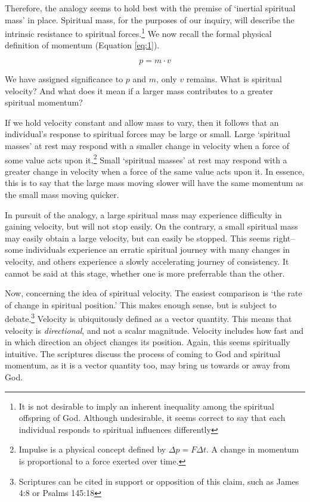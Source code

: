 \documentclass{article}
\begin{document}
                Therefore, the analogy seems to hold best with the premise of `inertial spiritual mass' in place. Spiritual mass, for the purposes of our inquiry, will describe the intrinsic resistance to spiritual forces.\footnote{It is not desirable to imply an inherent inequality among the spiritual offspring of God. Although undesirable, it seems correct to say that each individual responds to spiritual influences differently}
                We now recall the formal physical definition of momentum (Equation \ref{eq:1}).

                \[p = m \cdot v\]

                We have assigned significance to $p$ and $m$, only $v$ remains. What is spiritual velocity? And what does it mean if a larger mass contributes to a greater spiritual momentum?
                
                If we hold velocity constant and allow mass to vary, then it follows that an individual's response to spiritual forces may be large or small. 
                Large `spiritual masses' at rest may respond with a smaller change in velocity when a force of some value acts upon it.\footnote{Impulse is a physical concept defined by $\Delta p = F \Delta t$. A change in momentum is proportional to a force exerted over time.}
                Small `spiritual masses' at rest may respond with a greater change in velocity when a force of the same value acts upon it.
                In essence, this is to say that the large mass moving slower will have the same momentum as the small mass moving quicker. 

                In pursuit of the analogy, a large spiritual mass may experience difficulty in gaining velocity, but will not stop easily. 
                On the contrary, a small spiritual mass may easily obtain a large velocity, but can easily be stopped. 
                This seems right-- some individuals experience an erratic spiritual journey with many changes in velocity, and others experience a slowly accelerating journey of consistency.
                It cannot be said at this stage, whether one is more preferrable than the other.

                Now, concerning the idea of spiritual velocity. The easiest comparison is `the rate of change in spiritual position.' This makes enough sense, but is subject to debate.\footnote{Scriptures can be cited in support or opposition of this claim, such as James 4:8 or Psalms 145:18}
                Velocity is ubiquitously defined as a vector quantity. This means that velocity is \emph{directional}, and not a scalar magnitude. Velocity includes how fast and in which direction an object changes its position.
                Again, this seems spiritually intuitive. The scriptures discuss the process of coming to God and spiritual momentum, as it is a vector quantity too, may bring us towards or away from God. 
\end{document}
